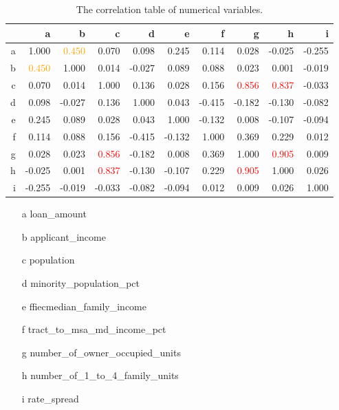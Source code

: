 \documentclass[a4paper,10pt,notitlepage]{article}
\begin{document}
\begin{table}
\centering
\caption{The correlation table of numerical variables.}
\label{tab:corr}
\begin{tabular}{r{1cm}r{1cm}r{1cm}r{1cm}r{1cm}r{1cm}r{1cm}r{1cm}r{1cm}r{1cm}}
\hline \hline
 & a & b & c & d & e & f & g & h & i \\
 \hline
 a  & 1.000  & \textcolor{orange}{0.450}  & 0.070  & 0.098  & 0.245  & 0.114  & 0.028  & -0.025  & -0.255 \\
 b  & \textcolor{orange}{0.450}  & 1.000  & 0.014  & -0.027  & 0.089  & 0.088  & 0.023  & 0.001  & -0.019 \\
 c  & 0.070  & 0.014  & 1.000  & 0.136  & 0.028  & 0.156  & \textcolor{red}{0.856}  & \textcolor{red}{0.837}  & -0.033 \\
 d  & 0.098  & -0.027  & 0.136  & 1.000  & 0.043  & -0.415  & -0.182  & -0.130  & -0.082 \\
 e  & 0.245  & 0.089  & 0.028  & 0.043  & 1.000  & -0.132  & 0.008  & -0.107  & -0.094 \\
 f  & 0.114  & 0.088  & 0.156  & -0.415  & -0.132  & 1.000  & 0.369  & 0.229  & 0.012 \\
 g  & 0.028  & 0.023  & \textcolor{red}{0.856}  & -0.182  & 0.008  & 0.369  & 1.000  & \textcolor{red}{0.905}  & 0.009 \\
 h  & -0.025  & 0.001  & \textcolor{red}{0.837}  & -0.130  & -0.107  & 0.229  & \textcolor{red}{0.905}  & 1.000  & 0.026 \\
 i  & -0.255  & -0.019  & -0.033  & -0.082  & -0.094  & 0.012  & 0.009  & 0.026  & 1.000 \\
 \hline
\end{tabular}
\begin{footnotesize}
\begin{itemize}
    \item[a] loan\_amount
    \item[b] applicant\_income
    \item[c] population
    \item[d] minority\_population\_pct
    \item[e] ffiecmedian\_family\_income
    \item[f] tract\_to\_msa\_md\_income\_pct
    \item[g] number\_of\_owner\_occupied\_units
    \item[h] number\_of\_1\_to\_4\_family\_units
    \item[i] rate\_spread
\end{itemize}
\end{footnotesize}
\end{table}
\end{document}
